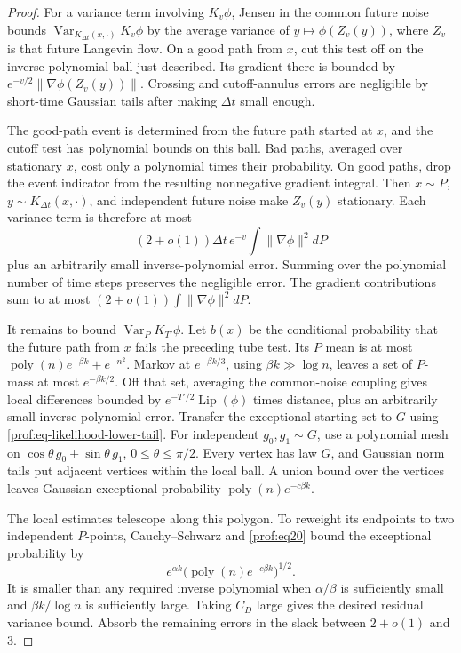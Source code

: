 \begin{proof}
For a variance term involving \(K_v\phi\), Jensen in the common future
noise bounds
\(\operatorname{Var}_{K_{\Delta t}(x,\cdot)}K_v\phi\) by the average
variance of \(y\mapsto\phi(Z_v(y))\), where \(Z_v\) is that future
Langevin flow.  On a good path from \(x\), cut this test off on the
inverse-polynomial ball just described.  Its gradient there is bounded by
\(e^{-v/2}\|\nabla\phi(Z_v(y))\|\).  Crossing and cutoff-annulus errors
are negligible by short-time Gaussian tails after making \(\Delta t\)
small enough.

The good-path event is determined from the future path started at
\(x\), and the cutoff test has polynomial bounds on this ball.
Bad paths, averaged over stationary \(x\), cost only a polynomial
times their probability. On good paths, drop the event indicator
from the resulting nonnegative gradient integral. Then
\(x\sim P\), \(y\sim K_{\Delta t}(x,\cdot)\), and independent
future noise make \(Z_v(y)\) stationary. Each variance term is
therefore at most
\[
 (2+o(1))\Delta t\,e^{-v}
       \int\|\nabla\phi\|^2dP
\]
plus an arbitrarily small inverse-polynomial error.  Summing over the polynomial number of time steps preserves the
negligible error. The gradient contributions sum to at most
\((2+o(1))\int\|\nabla\phi\|^2dP\).

It remains to bound \(\operatorname{Var}_P K_{T'}\phi\).
Let \(b(x)\) be the conditional probability that the future path
from \(x\) fails the preceding tube test. Its \(P\) mean is at
most \(\operatorname{poly}(n)e^{-\beta k}+e^{-n^2}\). Markov at
\(e^{-\beta k/3}\), using \(\beta k\gg\log n\), leaves a set of
\(P\)-mass at most \(e^{-\beta k/2}\). Off that set, averaging the
common-noise coupling gives local differences bounded by
\(e^{-T'/2}\operatorname{Lip}(\phi)\) times distance, plus an
arbitrarily small inverse-polynomial error.  Transfer the exceptional
starting set to \(G\) using \eqref{prof:eq-likelihood-lower-tail}.
For independent \(g_0,g_1\sim G\), use a polynomial mesh on
\(\cos\theta\,g_0+\sin\theta\,g_1\), \(0\le\theta\le\pi/2\).
Every vertex has law \(G\), and Gaussian norm tails put adjacent
vertices within the local ball. A union bound over the vertices
leaves Gaussian exceptional probability
\(\operatorname{poly}(n)e^{-c\beta k}\).

The local estimates telescope along this polygon. To reweight its
endpoints to two independent \(P\)-points, Cauchy--Schwarz and
\eqref{prof:eq20} bound the exceptional probability by
\[
 e^{\alpha k}
       \bigl(\operatorname{poly}(n)e^{-c\beta k}\bigr)^{1/2}.
\]
It is smaller than any required inverse polynomial when
\(\alpha/\beta\) is sufficiently small and \(\beta k/\log n\)
is sufficiently large. Taking \(C_D\) large gives
the desired residual variance bound.  Absorb the remaining errors in
the slack between \(2+o(1)\) and \(3\).
\end{proof}

